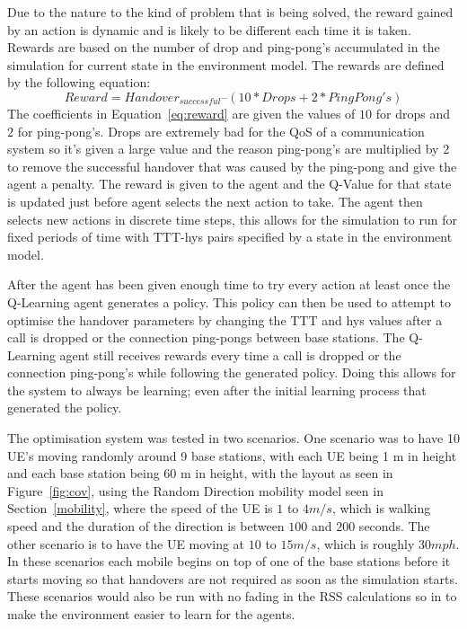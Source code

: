 Due to the nature to the kind of problem that is being solved, the reward gained by an action is dynamic and is likely to be different each time it is taken. Rewards are based on the number of drop and ping-pong's accumulated in the simulation for current state in the environment model. The rewards are defined by the following equation:
\begin{equation}\label{eq:reward}
Reward = Handover_{successful} – (10*Drops + 2*PingPong's)
\end{equation}
The coefficients in Equation~\ref{eq:reward} are given the values of $10$ for drops and $2$ for ping-pong's. Drops are extremely bad for the QoS of a communication system so it's given a large value and the reason ping-pong's are multiplied by $2$ to remove the successful handover that was caused by the ping-pong and give the agent a penalty. The reward is given to the agent and the Q-Value for that state is updated just before agent selects the next action to take.  The agent then selects new actions in discrete time steps, this allows for the simulation to run for fixed periods of time with TTT-hys pairs specified by a state in the environment model. 

After the agent has been given enough time to try every action at least once the Q-Learning agent generates a policy. This policy can then be used to attempt to optimise the handover parameters by changing the TTT and hys values after a call is dropped or the connection ping-pongs between base stations. The Q-Learning agent still receives rewards every time a call is dropped or the connection ping-pong's while following the generated policy. Doing this allows for the system to always be learning; even after the initial learning process that generated the policy.

The optimisation system was tested in two scenarios. One scenario was to have 10 UE's moving randomly around 9 base stations, with each UE being 1 m in height and each base station being 60 m in height, with the layout as seen in Figure~\ref{fig:cov}, using the Random Direction mobility model seen in Section~\ref{mobility}, where the speed of the UE is $1$ to $4 m/s$, which is walking speed and the duration of the direction is between $100$ and $200$ seconds. The other scenario is to have the UE moving at $10$ to $15 m/s$, which is roughly $30 mph$. In these scenarios each mobile begins on top of one of the base stations before it starts moving so that handovers are not required as soon as the simulation starts. These scenarios would also be run with no fading in the RSS calculations so in to make the environment easier to learn for the agents.

